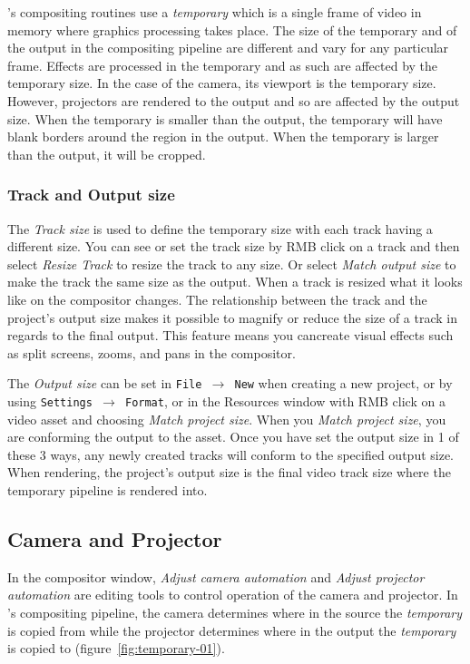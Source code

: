 \CGG{}'s compositing routines use a \textit{temporary} which is a single frame of video in
memory where graphics processing takes place. The size of the temporary and of the output in
the compositing pipeline are different and vary for any particular frame.  Effects are processed in
the temporary and as such are affected by the temporary size.  In the case of the camera, its
viewport is the temporary size. However, projectors are rendered to the output and so are affected
by the output size. When the temporary is smaller than the output, the temporary will have blank
borders around the region in the output.  When the temporary is larger than the output, it will be
cropped.

\subsubsection*{Track and Output size}%
\label{ssub:track_size}

The \textit{Track size} is used to define the temporary size with each track having a different size.
You can see or set the track size by RMB click on a track and then select \emph{Resize Track} to resize
the track to any size. Or select \emph{Match output size} to make the track the same size as the
output.  When a track is resized what it looks like on the compositor changes.  The relationship
between the track and the project's output size makes it possible to magnify or reduce the size of
a track in regards to the final output. This feature means you cancreate visual effects such as split
screens, zooms, and pans in the compositor.

The \textit{Output size} can be set in \texttt{File $\rightarrow$ New} when creating a new project,
or by using \texttt{Settings $\rightarrow$ Format}, or in the Resources window with RMB click on
a video asset and choosing \emph{Match project size}. When you \emph{Match project size}, you
are conforming the output to the asset. Once you have set the output size in 1 of these 3 ways,
any newly created tracks will conform to the specified output size.  When rendering, the project's
output size is the final video track size where the temporary pipeline is rendered into.  

\subsection{Camera and Projector}%
\label{sub:camera_and_projector}

In the compositor window, \textit{Adjust camera automation} and \textit{Adjust projector automation}
are editing tools to control operation of the camera and projector.  In \CGG{}'s compositing
pipeline, the camera determines where in the source the \textit{temporary} is copied from while
the projector determines where in the output the \textit{temporary} is copied to
(figure~\ref{fig:temporary-01}). 

